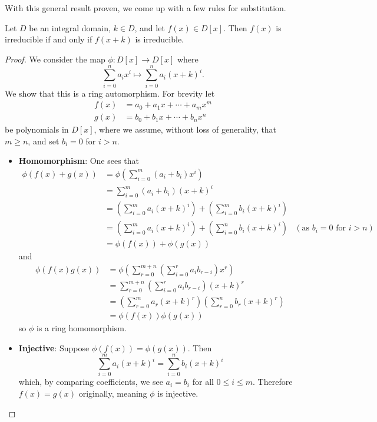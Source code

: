 With this general result proven, we come up with a few rules for substitution.

\begin{corollary}\label{corollary-irreducible-iff-translation-is-irreducible}
    Let $D$ be an integral domain, $k \in D$, and let $f(x) \in D[x]$. Then $f(x)$ is irreducible if and only if $f(x + k)$ is irreducible.
\end{corollary}
\begin{proof}
    We consider the map $\phi: D[x] \to D[x]$ where
    \[
        \sum_{i=0}^n a_ix^i \mapsto \sum_{i=0}^na_i(x+k)^i.
    \]
    We show that this is a ring automorphism. For brevity let
    \begin{align*}
        f(x) &= a_0 + a_1x + \cdots + a_mx^m\\
        g(x) &= b_0 + b_1x + \cdots + b_nx^n
    \end{align*}
    be polynomials in $D[x]$, where we assume, without loss of generality, that $m \geq n$, and set $b_i = 0$ for $i > n$.
    \begin{itemize}
        \item \textbf{Homomorphism}: One sees that
        \begin{align*}
            \phi(f(x) + g(x)) &= \phi\left(\sum_{i=0}^m(a_i+b_i)x^i\right)\\
            &= \sum_{i=0}^m(a_i+b_i)(x+k)^i\\
            &= \left(\sum_{i=0}^ma_i(x+k)^i\right) + \left(\sum_{i=0}^mb_i(x+k)^i\right)\\
            &= \left(\sum_{i=0}^ma_i(x+k)^i\right) + \left(\sum_{i=0}^nb_i(x+k)^i\right) & (\text{as } b_i = 0 \text{ for } i > n)\\
            &= \phi(f(x)) + \phi(g(x))
        \end{align*}
        and
        \begin{align*}
            \phi(f(x)g(x)) &= \phi\left(\sum_{r=0}^{m+n}\left(\sum_{i=0}^ra_ib_{r-i}\right)x^r\right)\\
            &= \sum_{r=0}^{m+n}\left(\sum_{i=0}^ra_ib_{r-i}\right)(x+k)^r\\
            &= \left(\sum_{r=0}^ma_r(x+k)^r\right)\left(\sum_{r=0}^nb_r(x+k)^r\right)\\
            &= \phi(f(x))\phi(g(x))
        \end{align*}
        so $\phi$ is a ring homomorphism.

        \item \textbf{Injective}: Suppose $\phi(f(x)) = \phi(g(x))$. Then
        \[
            \sum_{i=0}^ma_i(x+k)^i = \sum_{i=0}^nb_i(x+k)^i
        \]
        which, by comparing coefficients, we see $a_i = b_i$ for all $0 \leq i \leq m$. Therefore $f(x) = g(x)$ originally, meaning $\phi$ is injective.


\end{itemize}
\end{proof}
